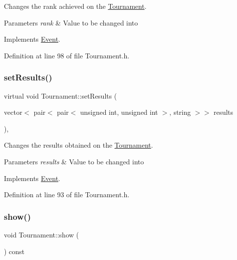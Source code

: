 Changes the rank achieved on the \hyperlink{class_tournament}{Tournament}. 


\begin{DoxyParams}{Parameters}
{\em rank} & Value to be changed into \\
\hline
\end{DoxyParams}


Implements \hyperlink{class_event_a5bccaba301e9038957ec4138df404524}{Event}.



Definition at line 98 of file Tournament.\+h.

\hypertarget{class_tournament_acab9ee32169ba590f4ffdb5b59b28a86}{}\label{class_tournament_acab9ee32169ba590f4ffdb5b59b28a86} 
\subsubsection{\texorpdfstring{set\+Results()}{setResults()}}
{\footnotesize\ttfamily virtual void Tournament\+::set\+Results (\begin{DoxyParamCaption}\item[{vector$<$ pair$<$ pair$<$ unsigned int, unsigned int $>$, string $>$$>$}]{results }\end{DoxyParamCaption})\hspace{0.3cm}{\ttfamily [inline]}, {\ttfamily [virtual]}}



Changes the results obtained on the \hyperlink{class_tournament}{Tournament}. 


\begin{DoxyParams}{Parameters}
{\em results} & Value to be changed into \\
\hline
\end{DoxyParams}


Implements \hyperlink{class_event_a5ddb261642035be78677d668f9238339}{Event}.



Definition at line 93 of file Tournament.\+h.

\hypertarget{class_tournament_a35bd5292194edb5d5c220838b68cda75}{}\label{class_tournament_a35bd5292194edb5d5c220838b68cda75} 
\subsubsection{\texorpdfstring{show()}{show()}}
{\footnotesize\ttfamily void Tournament\+::show (\begin{DoxyParamCaption}{ }\end{DoxyParamCaption}) const\hspace{0.3cm}{\ttfamily [virtual]}}



